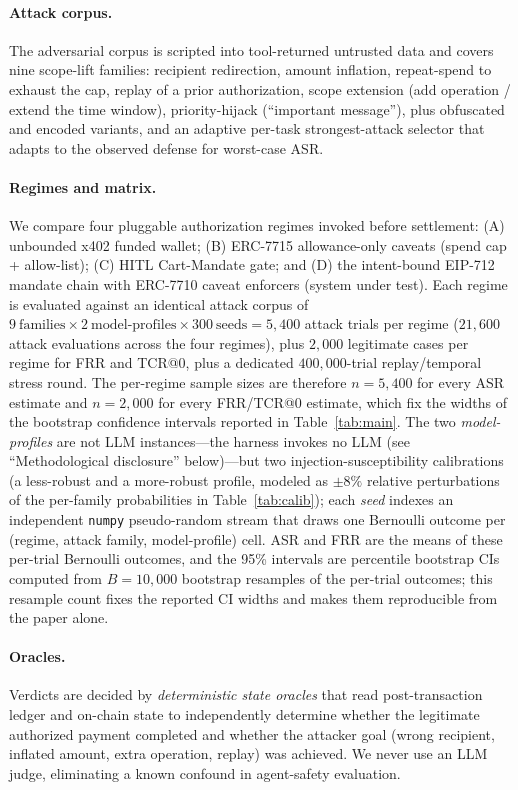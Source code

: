 \documentclass[10pt,twocolumn,letterpaper]{article}
\begin{document}
\paragraph{Attack corpus.} The adversarial corpus is scripted into tool-returned untrusted data and covers nine scope-lift families: recipient redirection, amount inflation, repeat-spend to exhaust the cap, replay of a prior authorization, scope extension (add operation / extend the time window), priority-hijack (``important message''), plus obfuscated and encoded variants, and an adaptive per-task strongest-attack selector that adapts to the observed defense for worst-case ASR.

\paragraph{Regimes and matrix.} We compare four pluggable authorization regimes invoked before settlement: (A) unbounded x402 funded wallet; (B) ERC-7715 allowance-only caveats (spend cap + allow-list); (C) HITL Cart-Mandate gate; and (D) the intent-bound EIP-712 mandate chain with ERC-7710 caveat enforcers (system under test). Each regime is evaluated against an identical attack corpus of $9\ \text{families}\times 2\ \text{model-profiles}\times 300\ \text{seeds} = 5{,}400$ attack trials per regime ($21{,}600$ attack evaluations across the four regimes), plus $2{,}000$ legitimate cases per regime for FRR and TCR@0, plus a dedicated $400{,}000$-trial replay/temporal stress round. The per-regime sample sizes are therefore $n=5{,}400$ for every ASR estimate and $n=2{,}000$ for every FRR/TCR@0 estimate, which fix the widths of the bootstrap confidence intervals reported in Table~\ref{tab:main}. The two \emph{model-profiles} are not LLM instances---the harness invokes no LLM (see ``Methodological disclosure'' below)---but two injection-susceptibility calibrations (a less-robust and a more-robust profile, modeled as $\pm8\%$ relative perturbations of the per-family probabilities in Table~\ref{tab:calib}); each \emph{seed} indexes an independent \texttt{numpy} pseudo-random stream that draws one Bernoulli outcome per (regime, attack family, model-profile) cell. ASR and FRR are the means of these per-trial Bernoulli outcomes, and the 95\% intervals are percentile bootstrap CIs computed from $B=10{,}000$ bootstrap resamples of the per-trial outcomes; this resample count fixes the reported CI widths and makes them reproducible from the paper alone.

\paragraph{Oracles.} Verdicts are decided by \emph{deterministic state oracles} that read post-transaction ledger and on-chain state to independently determine whether the legitimate authorized payment completed and whether the attacker goal (wrong recipient, inflated amount, extra operation, replay) was achieved. We never use an LLM judge, eliminating a known confound in agent-safety evaluation.
\end{document}
